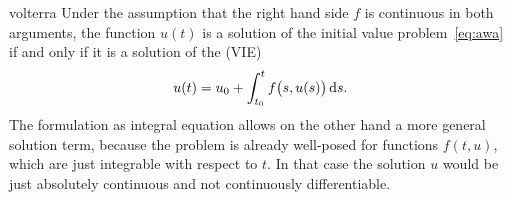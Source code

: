 \begin{Lemma}{volterra}
  Under the assumption that the right hand side $f$ is continuous in
  both arguments, the function $u(t)$ is a solution of the initial
  value problem~\eqref{eq:awa} if and only if it is a solution of the
   (VIE) 
  \begin{gather}
    \label{eq:volterra}
    u(t) = u_0 + \int_{t_0}^t f\bigl(s,u(s)\bigr)\,\mathrm{d} s.
  \end{gather}
  The formulation as integral equation allows on the other hand a more
  general solution term, because the problem is already well-posed for
  functions $f(t,u)$, which are just integrable with respect to $t$.
  In that case the solution $u$ would be just absolutely continuous
  and not continuously differentiable.
\end{Lemma}

